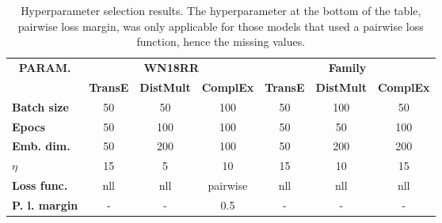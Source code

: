 \begin{table}[htbp]
\centering
\begin{tabular}{l|ccc|ccc}
\multicolumn{1}{c|}{\multirow{2}{*}{\textbf{PARAM.}}} & \multicolumn{3}{c|}{\textbf{WN18RR}}                                                                                  & \multicolumn{3}{c}{\textbf{Family}}                                                                                  \\ \cline{2-7} 
\multicolumn{1}{c|}{}                                 & \multicolumn{1}{c|}{\textbf{TransE}} & \multicolumn{1}{c|}{\textbf{DistMult}} & \multicolumn{1}{c|}{\textbf{ComplEx}} & \multicolumn{1}{c|}{\textbf{TransE}} & \multicolumn{1}{c|}{\textbf{DistMult}} & \multicolumn{1}{c}{\textbf{ComplEx}} \\ \hline
\textbf{Batch size}                                 & 50                                   & 50                                     & 100                                   & 50                                   & 100                                    & 50                                    \\
\textbf{Epocs}                                         & 50                                   & 100                                    & 100                                   & 50                                   & 50                                     & 100                                   \\
\textbf{Emb. dim.}                                     & 50                                   & 200                                    & 100                                   & 50                                   & 200                                    & 200                                   \\
\textbf{$\eta$}                           & 15                                   & 5                                      & 10                                    & 15                                   & 10                                     & 15                                    \\
\textbf{Loss func.}                                 & nll                                  & nll                                    & pairwise                              & nll                                  & nll                                    & nll                                   \\
\textbf{P. l. margin}                                & -                                    & -                                      & 0.5                                   & -                                    & -                                      & -                                    
\end{tabular}
\caption[Hyperparameter selection results]{Hyperparameter selection results. The hyperparameter at the bottom of the table, pairwise loss margin, was only applicable for those models that used a pairwise loss function, hence the missing values.}
\label{hyperparameter_selection_results}
\end{table}


